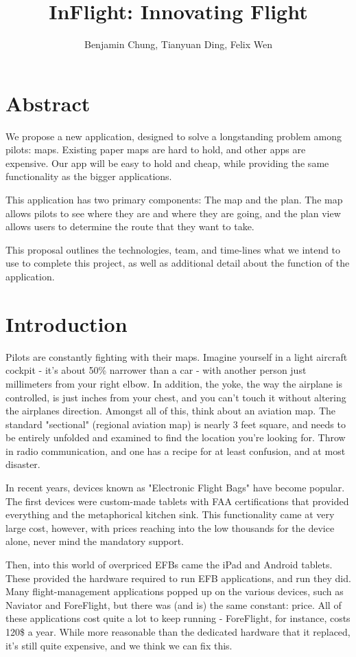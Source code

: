\documentclass[10pt,a4paper]{article}
\author{Benjamin Chung, Tianyuan Ding, Felix Wen}
\title{InFlight: Innovating Flight}
\begin{document}
\maketitle
\section*{Abstract}
We propose a new application, designed to solve a longstanding problem among pilots: maps. Existing paper maps are hard to hold, and other apps are expensive. Our app will be easy to hold and cheap, while providing the same functionality as the bigger applications.

This application has two primary components: The map and the plan. The map allows pilots to see where they are and where they are going, and the plan view allows users to determine the route that they want to take.

This proposal outlines the technologies, team, and time-lines what we intend to use to complete this project, as well as additional detail about the function of the application.
\tableofcontents
\section{Introduction}
Pilots are constantly fighting with their maps. Imagine yourself in a light aircraft cockpit - it's about 50\% narrower than a car - with another person just millimeters from your right elbow. In addition, the yoke, the way the airplane is controlled, is just inches from your chest, and you can't touch it without altering the airplanes direction. Amongst all of this, think about an aviation map. The standard "sectional" (regional aviation map) is nearly 3 feet square, and needs to be entirely unfolded and examined to find the location you're looking for. Throw in radio communication, and one has a recipe for at least confusion, and at most disaster. 

In recent years, devices known as "Electronic Flight Bags" have become popular. The first devices were custom-made tablets with FAA certifications that provided everything and the metaphorical kitchen sink. This functionality came at very large cost, however, with prices reaching into the low thousands for the device alone, never mind the mandatory support.

Then, into this world of overpriced EFBs came the iPad and Android tablets. These provided the hardware required to run EFB applications, and run they did. Many flight-management applications popped up on the various devices, such as Naviator and ForeFlight, but there was (and is) the same constant: price. All of these applications cost quite a lot to keep running - ForeFlight, for instance, costs 120\$ a year. While more reasonable than the dedicated hardware that it replaced, it's still quite expensive, and we think we can fix this.
\end{document}
